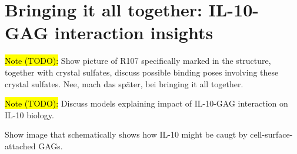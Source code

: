 \chapter{Bringing it all together: IL-10-GAG interaction insights}
\lipsum[1-10]


\hl{Note (TODO):}
Show picture of R107 specifically marked in the structure, together with
crystal sulfates, discuss possible binding poses involving these crystal
sulfates. Nee, mach das später, bei bringing it all together.

\hl{Note (TODO):}
Discuss models explaining impact of IL-10-GAG interaction on IL-10 biology.

Show image that schematically shows how IL-10 might be caugt by cell-surface-attached GAGs.

